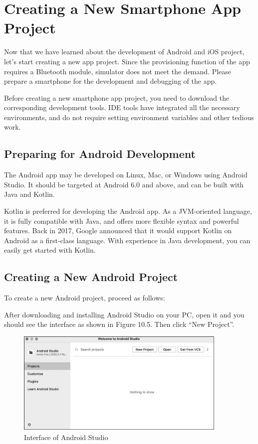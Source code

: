 \documentclass[a4paper,12pt,openany]{book}
\begin{document}
\section{Creating a New Smartphone App Project}
Now that we have learned about the development of Android and iOS project, let’s start creating a new app project. Since the provisioning function of the app requires a Bluetooth module, simulator does not meet the demand. Please prepare a smartphone for the development and debugging of the app.

Before creating a new smartphone app project, you need to download the corresponding development tools. IDE tools have integrated all the necessary environments, and do not require setting environment variables and other tedious work.

\subsection{Preparing for Android Development}
The Android app may be developed on Linux, Mac, or Windows using Android Studio. It should be targeted at Android 6.0 and above, and can be built with Java and Kotlin.

Kotlin is preferred for developing the Android app. As a JVM-oriented language, it is fully compatible with Java, and offers more flexible syntax and powerful features. Back in 2017, Google announced that it would support Kotlin on Android as a first-class language. With experience in Java development, you can easily get started with Kotlin.

\subsection{Creating a New Android Project}
To create a new Android project, proceed as follows:

After downloading and installing Android Studio on your PC, open it and you should see the interface as shown in Figure 10.5. Then click “New Project”.

\begin{figure}[ht]
    \centering
    \includegraphics[width=0.9\textwidth]{D10Z/10-5}
    \caption{Interface of Android Studio}
\end{figure}
\end{document}

